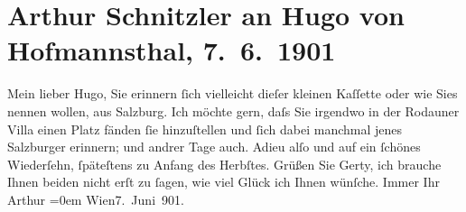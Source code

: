 

         
         \renewcommand{\erwaehntePersonen}{Personen: Hugo von Hofmannsthal, Gertrude von Hofmannsthal}
         \renewcommand{\erwaehnteInstitutionen}{Institutionen: Wenzel Swatek}
         \renewcommand{\erwaehnteOrte}{Orte: Hofmannsthal-Schlössl, Salzburg, Wien}
         \renewcommand{\erwaehnteWerke}{}
               \section[Arthur Schnitzler an Hugo von Hofmannsthal, 7. 6. 1901]{ Arthur Schnitzler an Hugo von Hofmannsthal, 7. 6. 1901}\nopagebreak{}\rehead{ }\begin{ledgroupsized}[t]{13cm}\normalsize\beginnumbering \toendnotes[C]{\smallbreak\pagebreak[2]} 
\toendnotes[C]{\smallbreak}\pstart{}{\pb}Mein lieber Hugo, \pend\pstart
           Sie erinnern ſich vielleicht dieſer kleinen Kaſſette oder wie Sies nennen wollen, aus
                  Salzburg. Ich möchte gern, daſs Sie irgendwo in
               der Rodauner Villa einen Platz fänden ſie
               hinzuſtellen und ſich dabei manchmal jenes Salzburger \label{K_L01125_1v}\label{K_L01125_1h} erinnern; und {\pb}andrer Tage auch. Adieu alſo und
               auf ein ſchönes Wiederſehn, ſpäteſtens zu Anfang des Herbſtes.\pend
           \pstart
           Grüßen Sie Gerty, ich brauche Ihnen beiden
               nicht erſt zu ſagen, wie viel Glück ich Ihnen wünſche.\pend
           \pstart
           Immer Ihr{\\[\baselineskip]}\spacefill\mbox{Arthur}\pend
           \leftskip=0em{}\pstart
           Wien7. Juni 901.\pend
           
         
         \endnumbering{}\end{ledgroupsized}  \newcommand{\dateiname}{L01125}\newcommand{\titel}{Arthur Schnitzler an Hugo von Hofmannsthal, 7. 6. 1901}\newcommand{\editorInnen}{Martin Anton Müller und Gerd-Hermann Susen}
      